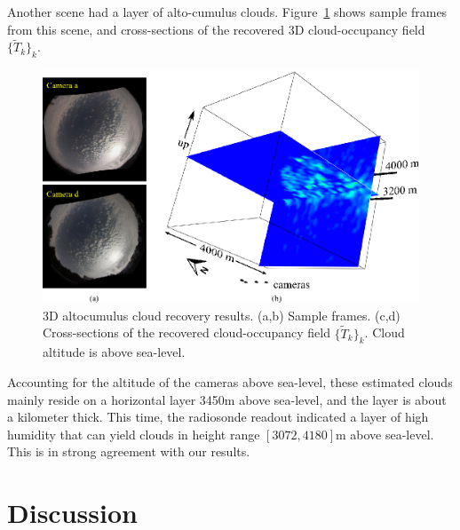 \documentclass[runningheads]{llncs}
\begin{document}
Another scene had a layer of alto-cumulus clouds. Figure~\ref{fig:alto} shows sample frames from this scene, and cross-sections of the recovered 3D cloud-occupancy field $\{\tilde T_k\}_k$.
\begin{figure}[t!]
\begin{center}
   \includegraphics[width=1\linewidth]{figures/altos.eps}
\end{center}
   \vspace{-0.6cm}
   \caption{3D altocumulus cloud recovery results. (a,b) Sample frames.
   (c,d)  Cross-sections of the recovered cloud-occupancy field $\{\tilde T_k\}_k$. Cloud
   altitude is above sea-level.}
\label{fig:alto}
\end{figure}
Accounting for the altitude of the cameras above sea-level, these estimated clouds mainly reside on a horizontal layer 3450m above sea-level, and the layer is about a kilometer thick. This time, the radiosonde readout indicated a layer of high humidity that can yield clouds in height range $[3072,4180]$m above sea-level. This is in strong agreement with our results.





%


\section{Discussion}
\label{sec:discuss}
\end{document}

